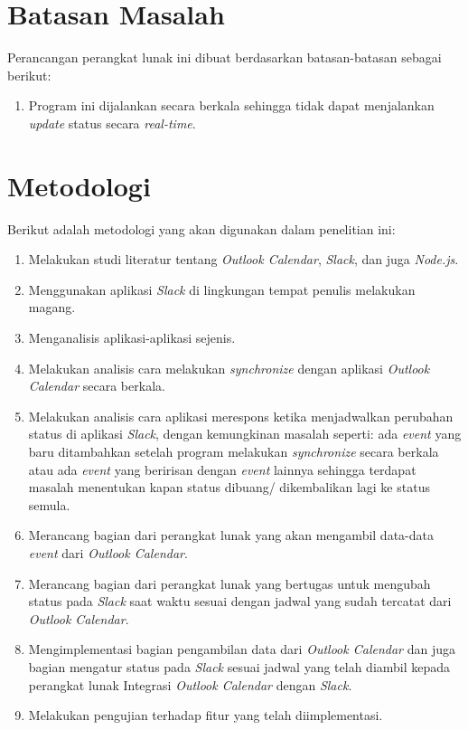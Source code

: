 \section{Batasan Masalah}
\label{sec:batasan}
Perancangan perangkat lunak ini dibuat berdasarkan batasan-batasan sebagai berikut: 
\begin{enumerate}
	\item Program ini dijalankan secara berkala sehingga tidak dapat menjalankan \textit{update} status secara \textit{real-time}. 
\end{enumerate}

\section{Metodologi}
\label{sec:metlit}
Berikut adalah metodologi yang akan digunakan dalam penelitian ini: 
\begin{enumerate}
	\item Melakukan studi literatur tentang \textit{Outlook Calendar}, \textit{Slack}, dan juga \textit{Node.js}.
	\item Menggunakan aplikasi \textit{Slack} di lingkungan tempat penulis melakukan magang. 
	\item Menganalisis aplikasi-aplikasi sejenis. 
	\item Melakukan analisis cara melakukan \textit{synchronize} dengan aplikasi \textit{Outlook Calendar} secara berkala.
	\item Melakukan analisis cara aplikasi merespons ketika menjadwalkan perubahan status di aplikasi \textit{Slack}, dengan kemungkinan masalah seperti: ada \textit{event} yang baru ditambahkan setelah program melakukan \textit{synchronize} secara berkala atau ada \textit{event} yang beririsan dengan \textit{event} lainnya sehingga terdapat masalah menentukan kapan status dibuang/ dikembalikan lagi ke status semula. 
	\item Merancang bagian dari perangkat lunak yang akan mengambil data-data \textit{event} dari \textit{Outlook Calendar}. 
	\item Merancang bagian dari perangkat lunak yang bertugas untuk mengubah status pada \textit{Slack} saat waktu sesuai dengan jadwal yang sudah tercatat dari \textit{Outlook Calendar}.
	\item Mengimplementasi bagian pengambilan data dari \textit{Outlook Calendar} dan juga bagian mengatur status pada \textit{Slack} sesuai jadwal yang telah diambil kepada perangkat lunak Integrasi \textit{Outlook Calendar} dengan \textit{Slack}.
	\item Melakukan pengujian terhadap fitur yang telah diimplementasi.
\end{enumerate}

